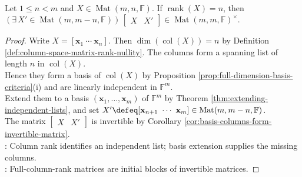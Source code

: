 \begin{theorem} \label{thm:complete-full-column-rank-matrix} \\
Let $1\leq n<m$ and $X\in\operatorname{Mat}(m,n,\mathbb{F})$. If $\operatorname{rank}(X)=n$, then $(\exists\,X'\in\operatorname{Mat}(m,m-n,\mathbb{F}))\,\left[\begin{smallmatrix}X&X'\end{smallmatrix}\right]\in\operatorname{Mat}(m,m,\mathbb{F})^{\times}$.
\begin{proof}
Write $X=[\mathbf{x}_1\ \cdots\ \mathbf{x}_n]$. Then $\dim(\operatorname{col}(X))=n$ by Definition \ref{def:column-space-matrix-rank-nullity}. The columns form a spanning list of length $n$ in $\operatorname{col}(X)$.\\
Hence they form a basis of $\operatorname{col}(X)$ by Proposition \ref{prop:full-dimension-basis-criteria}(i) and are linearly independent in $\mathbb{F}^m$.\\
Extend them to a basis $(\mathbf{x}_1,\ldots,\mathbf{x}_m)$ of $\mathbb{F}^m$ by Theorem \ref{thm:extending-independent-lists}, and set $X'\defeq[\mathbf{x}_{n+1}\ \cdots\ \mathbf{x}_m]\in\operatorname{Mat}(m,m-n,\mathbb{F})$.\\
The matrix $\left[\begin{smallmatrix}X&X'\end{smallmatrix}\right]$ is invertible by Corollary \ref{cor:basis-columns-form-invertible-matrix}.\\
: Column rank identifies an independent list; basis extension supplies the missing columns.\\
: Full-column-rank matrices are initial blocks of invertible matrices.
\end{proof}
\end{theorem}

